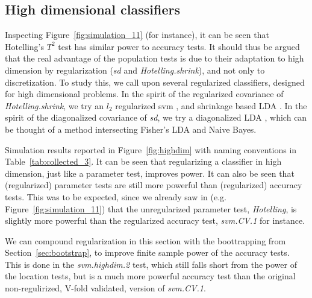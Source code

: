 \documentclass[12pt,a4paper]{article}
\theoremstyle{definition}
\begin{document}
\subsection{High dimensional classifiers}
Inspecting Figure~\ref{fig:simulation_11} (for instance), it can be seen that Hotelling's $T^2$ test has similar power to accuracy tests. 
It should thus be argued that the real advantage of the population tests is due to their adaptation to high dimension by regularization (\emph{sd} and \emph{Hotelling.shrink}), and not only to discretization.
To study this, we call upon several regularized classifiers, designed for high dimensional problems. 
In the spirit of the regularized covariance of \emph{Hotelling.shrink}, we try an $l_2$ regularized svm \cite{friedman_regularization_2010}, and shrinkage based LDA \citep{pang_shrinkage-based_2009,ramey_high-dimensional_2016}. %
In the spirit of the diagonalized covariance of \emph{sd}, we try a diagonalized LDA \citep{dudoit_comparison_2002}, which can be thought of a method intersecting Fisher's LDA and Naive Bayes. 


Simulation results reported in Figure~\ref{fig:highdim} with naming conventions in Table~\ref{tab:collected_3}.
It can be seen that regularizing a classifier in high dimension, just like a parameter test, improves power. 
It can also be seen that (regularized) parameter tests are still more powerful than (regularized) accuracy tests. 
This was to be expected, since we already saw in (e.g. Figure~\ref{fig:simulation_11}) that the unregularized parameter test, \emph{Hotelling}, is slightly more powerful than the regularized accuracy test, \emph{svm.CV.1} for instance.

We can compound regularization in this section with the boottrapping from Section~\ref{sec:bootstrap}, to improve finite sample power of the accuracy tests. 
This is done in the \emph{svm.highdim.2} test, which still falls short from the power of the location tests, but is a much more powerful accuracy test than the original non-regulirized, V-fold validated, version of \emph{svm.CV.1}.

\bigskip
\end{document}
